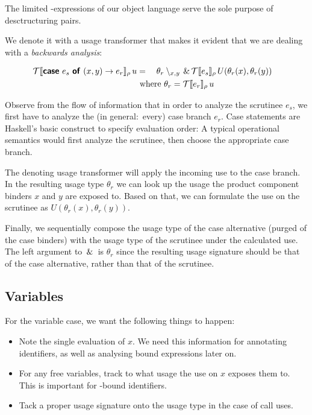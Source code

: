 The limited -expressions of our object language serve the sole purpose of desctructuring pairs.

We denote it with a usage transformer that makes it evident that we are dealing with a \emph{backwards analysis}:

\begin{alignat*}{2}
\transfer{\sCase{e_s}{x}{y}{e_r}}{\rho}\,u &{}={}& \theta_r\setminus_{x,y} \both \transfer{e_s}{\rho}\,U(\theta_r(x),\theta_r(y)) \\
   &\rlap{ where $\theta_r = \transfer{e_r}{\rho}\,u$} &&
\end{alignat*}

Observe from the flow of information that in order to analyze the scrutinee $e_s$, we first have to analyze the (in general:\ every) case branch $e_r$. 
Case statements are Haskell's basic construct to specify evaluation order: 
A typical operational semantics would first analyze the scrutinee, then choose the appropriate case branch.

The denoting usage transformer will apply the incoming use to the case branch.
In the resulting usage type $\theta_r$ we can look up the usage the product component binders $x$ and $y$ are exposed to.
Based on that, we can formulate the use on the scrutinee as $U(\theta_r(x), \theta_r(y))$.

Finally, we sequentially compose the usage type of the case alternative (purged of the case binders) with the usage type of the scrutinee under the calculated use.
The left argument to $\,\&\,$ is $\theta_r$ since the resulting usage signature should be that of the case alternative, rather than that of the scrutinee.

\subsection{Variables}\label{sec:var}

For the variable case, we want the following things to happen:

\begin{itemize}
\item Note the single evaluation of $x$. We need this information for annotating identifiers, as well as analysing bound expressions later on.
\item For any free variables, track to what usage the use on $x$ exposes them to. This is important for -bound identifiers.
\item Tack a proper usage signature onto the usage type in the case of call uses.
\end{itemize}

